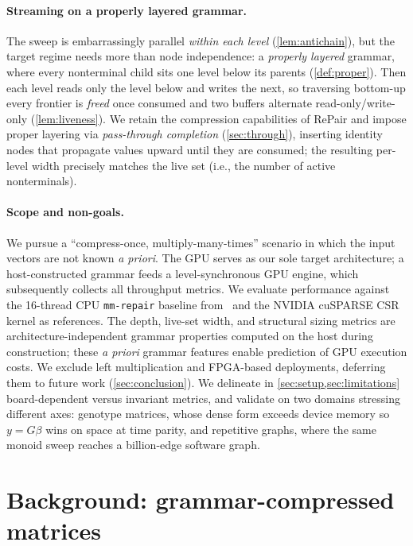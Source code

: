 \documentclass[twoside,leqno,twocolumn]{article}
\begin{document}
\paragraph{Streaming on a properly layered grammar.}

The sweep is embarrassingly parallel \emph{within each level} (\cref{lem:antichain}), but the target regime needs more than node independence: a \emph{properly layered} grammar, where every nonterminal child sits one level below its parents (\cref{def:proper}). Then each level reads only the level below and writes the next, so traversing bottom-up every frontier is \emph{freed} once consumed and two buffers alternate read-only/write-only (\cref{lem:liveness}). We retain the compression capabilities of RePair and impose proper layering via \emph{pass-through completion} (\cref{sec:through}), inserting identity nodes that propagate values upward until they are consumed; the resulting per-level width precisely matches the live set (i.e., the number of active nonterminals).

\paragraph{Scope and non-goals.}

We pursue a ``compress-once, multiply-many-times'' scenario in which the input vectors are not known \emph{a priori}. The GPU serves as our sole target architecture; a host-constructed grammar feeds a level-synchronous GPU engine, which subsequently collects all throughput metrics. We evaluate performance against the 16-thread CPU \texttt{mm-repair} baseline from~\cite{mmrepair} and the NVIDIA cuSPARSE CSR kernel \cite{nvidia2026cusparse} as references. The depth, live-set width, and structural sizing metrics are architecture-independent grammar properties computed on the host during construction; these \emph{a priori} grammar features enable prediction of GPU execution costs. We exclude left multiplication and FPGA-based deployments, deferring them to future work (\cref{sec:conclusion}). We delineate in \cref{sec:setup,sec:limitations} board-dependent versus invariant metrics, and validate on two domains stressing different axes: genotype matrices, whose dense form exceeds device memory so $y=G\beta$ wins on space at time parity, and repetitive graphs, where the same monoid sweep reaches a billion-edge software graph.

\section{Background: grammar-compressed matrices}
\label{sec:background}
\end{document}
